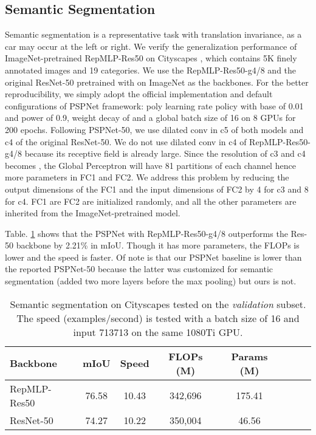 \documentclass[10pt,twocolumn,letterpaper]{article}
\begin{document}
\subsection{Semantic Segmentation}

Semantic segmentation is a representative task with translation invariance, as a car may occur at the left or right. We verify the generalization performance of ImageNet-pretrained RepMLP-Res50 on Cityscapes \cite{cityscapes}, which contains 5K finely annotated images and 19 categories. We use the RepMLP-Res50-g4/8 and the original ResNet-50 pretrained with  on ImageNet as the backbones. For the better reproducibility, we simply adopt the official implementation and default configurations \cite{official-pspnet} of PSPNet \cite{pspnet} framework: poly learning rate policy with base of 0.01 and power of 0.9, weight decay of  and a global batch size of 16 on 8 GPUs for 200 epochs. Following PSPNet-50, we use dilated conv in c5 of both models and c4 of the original ResNet-50. We do not use dilated conv in c4 of RepMLP-Res50-g4/8 because its receptive field is already large. Since the resolution of c3 and c4 becomes , the Global Perceptron will have 81 partitions of each channel hence more parameters in FC1 and FC2. We address this problem by reducing the output dimensions of the FC1 and the input dimensions of FC2 by 4 for c3 and 8 for c4. FC1 are FC2 are initialized randomly, and all the other parameters are inherited from the ImageNet-pretrained model.

Table. \ref{table-seg} shows that the PSPNet with RepMLP-Res50-g4/8 outperforms the Res-50 backbone by 2.21\% in mIoU. Though it has more parameters, the FLOPs is lower and the speed is faster. Of note is that our PSPNet baseline is lower than the reported PSPNet-50 because the latter was customized for semantic segmentation (added two more layers before the max pooling) but ours is not.

\setlength{\tabcolsep}{4pt}
\begin{table}
	\caption{Semantic segmentation on Cityscapes \cite{cityscapes} tested on the \textit{validation} subset. The speed (examples/second) is tested with a batch size of 16 and input 713713 on the same 1080Ti GPU.}
	\label{table-seg}
	\vspace{-0.2in}
	\begin{center}
		\small
		\begin{tabular}{lccccccc}
			\hline
			Backbone				&	mIoU	&	Speed	&	FLOPs (M)	&	Params (M)	\\
			\hline
			RepMLP-Res50			&	76.58		&	10.43	&	342,696		&	175.41	\\
			ResNet-50				&	74.27		&	10.22	&	350,004		&	46.56		\\
			\hline
		\end{tabular}
	\end{center}
	\vspace{-0.1in}
\end{table}
\setlength{\tabcolsep}{1.4pt}
\end{document}
